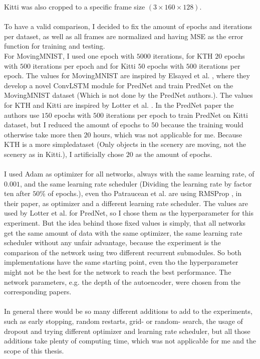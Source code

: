   Kitti was also cropped to a specific frame size $(3 \times 160 \times 128)$.\\\\
  To have a valid comparison, I decided to fix the amount of epochs and iterations per dataset, as well as all frames are normalized and having MSE as the
  error function for training and testing.\\
  For MovingMNIST, I used one epoch with $5000$ iterations, for KTH $20$ epochs with $500$ iterations per epoch and for Kitti $50$ epochs with $500$ iterations
  per epoch. The values for MovingMNIST are inspired by Elsayed et al. \cite{Elsayed2018}, where they develop a novel ConvLSTM module for PredNet and train
  PredNet on the MovingMNIST dataset (Which is not done by the PredNet authors.). The values for KTH and Kitti are inspired by Lotter et al. \cite{Lotter2016}.
  In the PredNet paper the authors use $150$ epochs with $500$ iterations per epoch to train PredNet on Kitti dataset, but I reduced the amount of epochs to
  $50$ because the training would otherwise take more then $20$ hours, which was not applicable for me. Because KTH is a more \glqq simple\grqq dataset (Only 
  objects in the scenery are moving, not the scenery as in Kitti.), I artificially chose $20$ as the amount of epochs.\\\\
  I used Adam \cite{Kingma2015} as optimizer for all networks, always with the same learning rate, of $0.001$, and the same learning rate scheduler (Dividing the 
  learning rate by factor ten after $50$\% of epochs.), even tho 
  Patraucean et al. \cite{Patraucean2015} are using RMSProp \cite{Ruder2016}, in their paper, as optimizer and a different learning rate scheduler.
  The values are used by Lotter et al. \cite{Lotter2016} for PredNet, so I chose them as the hyperparameter for this experiment.
  But the idea behind those fixed values is simply, that all networks get the same amount of data with the same optimizer, the same learning rate scheduler 
  without any unfair advantage, because the experiment is the comparison of the network using two different recurrent submodules. So both implementations
  have the same starting point, even tho the hyperparameter might not be the best for the network to reach the best performance.
  The network parameters, e.g. the depth of the autoencoder, were chosen from the corresponding papers.\\\\
  In general there would be so many different additions to add to the experiments, such as early stopping, random restarts, grid- or random-
  search, the usage of dropout and trying different optimizer and learning rate scheduler, but all those additions take plenty of computing time, which was not 
  applicable for me and the scope of this thesis.\\
  
